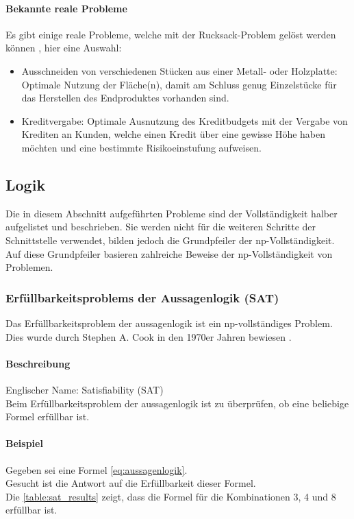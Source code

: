 	\paragraph{Bekannte reale Probleme}
	Es gibt einige reale Probleme, welche mit der Rucksack-Problem gelöst werden können \cite{kellerer2004knapsack}, hier eine Auswahl:	
	\begin{itemize}
		\item Ausschneiden von verschiedenen Stücken aus einer Metall- oder Holzplatte: Optimale Nutzung der Fläche(n), damit am Schluss genug Einzelstücke für das Herstellen 
			des Endproduktes vorhanden sind.
		\item Kreditvergabe: Optimale Ausnutzung des Kreditbudgets mit der Vergabe von Krediten an Kunden, welche einen Kredit über eine gewisse Höhe haben möchten und eine 
			bestimmte Risikoeinstufung aufweisen.
	\end{itemize}


\subsection{Logik}\label{logic}
Die in diesem Abschnitt aufgeführten Probleme sind der Vollständigkeit halber aufgelistet und beschrieben. Sie werden nicht für die weiteren Schritte der Schnittstelle verwendet, bilden jedoch 
die Grundpfeiler der \gls{np}-Vollständigkeit. Auf diese Grundpfeiler basieren zahlreiche Beweise der \gls{np}-Vollständigkeit von Problemen.

	\subsubsection{Erfüllbarkeitsproblems der Aussagenlogik (SAT)}\label{sat}
	Das Erfüllbarkeitsproblem der \gls{aussagenlogik} ist ein \gls{np}-vollständiges Problem. Dies wurde durch Stephen A. Cook in den 1970er Jahren bewiesen \cite{cook_complexity}.

	\paragraph{Beschreibung}
	Englischer Name: Satisfiability (SAT)\\
	Beim Erfüllbarkeitsproblem der \gls{aussagenlogik} ist zu überprüfen, ob eine beliebige  Formel erfüllbar ist.	

	\paragraph{Beispiel} Gegeben sei eine  Formel \ref{eq:aussagenlogik}.\\
	Gesucht ist die Antwort auf die Erfüllbarkeit dieser Formel.\\
	Die \autoref{table:sat_results} zeigt, dass die Formel für die Kombinationen 3, 4 und 8 erfüllbar ist.

